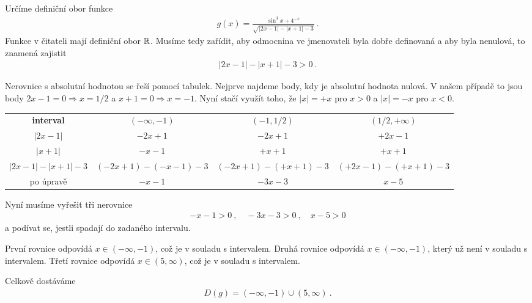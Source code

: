 \begin{example}
    Určíme definiční obor funkce \begin{align*}
        g(x) = \frac{\sin^3 x + 4^{-x}}{\sqrt{|2x-1|-|x+1|-3}} \:.
    \end{align*}
    Funkce v čitateli mají definiční obor $\mathbb{R}$. Musíme tedy zařídit, aby odmocnina ve jmenovateli byla dobře definovaná a aby byla nenulová, to znamená zajistit \begin{align*}
        |2x-1|-|x+1|-3 > 0 \:.
    \end{align*}

    Nerovnice s absolutní hodnotou se řeší pomocí tabulek. Nejprve najdeme body, kdy je absolutní hodnota nulová. V našem případě to jsou body $2x-1 = 0 \Rightarrow x=1/2$ a $x+1=0 \Rightarrow x=-1$. Nyní stačí využít toho, že $|x| = +x$ pro $x>0$ a $|x| = -x$ pro $x<0$.

    \begin{table}[H]
        \centering
        \begin{tabular}{c||c|c|c}
            
            \textbf{interval} & $(-\infty,-1)$ & $(-1,1/2)$ & $(1/2, +\infty)$ \\
            \hhline{=#=|=|=} 
            $|2x-1|$ & $-2x+1$ & $-2x+1$ & $+2x-1$ \\
            \hline
            $|x+1|$ & $-x-1$ & $+x+1$ & $+x+1$ \\
            \hhline{=#=|=|=}
            $|2x-1|-|x+1|-3$ & $(-2x+1)-(-x-1)-3$ & $(-2x+1)-(+x+1)-3$ & $(+2x-1)-(+x+1)-3$ \\
            \hline
            po úpravě & $-x-1$ & $ -3x - 3$ & $x-5$
            
        \end{tabular}
    \end{table}
    Nyní musíme vyřešit tři nerovnice \begin{align*}
        -x-1>0 \:, \quad -3x -3 >0 \:, \quad x-5 > 0 
    \end{align*}
    a podívat se, jestli spadají do zadaného intervalu.

    První rovnice odpovídá $x \in (-\infty,-1)$, což je v souladu s intervalem.
    Druhá rovnice odpovídá $x \in (-\infty,-1)$, který už není v souladu s intervalem.
    Třetí rovnice odpovídá $x \in (5, \infty)$, což je v souladu s intervalem.

    Celkově dostáváme 
    \begin{align*}
        \boxed{ D(g) = (-\infty, -1) \cup (5, \infty) } \:.
    \end{align*}
\end{example}
